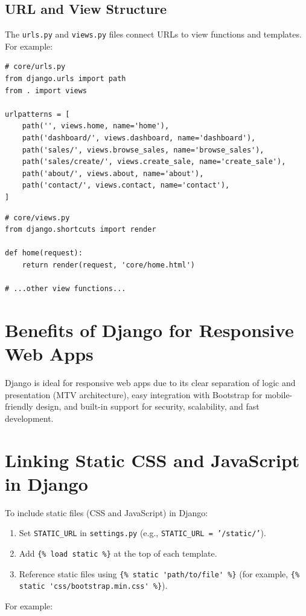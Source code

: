 \documentclass[12pt]{article}
\begin{document}
\subsection{URL and View Structure}
The \texttt{urls.py} and \texttt{views.py} files connect URLs to view functions and templates. For example:

\begin{verbatim}
# core/urls.py
from django.urls import path
from . import views

urlpatterns = [
    path('', views.home, name='home'),
    path('dashboard/', views.dashboard, name='dashboard'),
    path('sales/', views.browse_sales, name='browse_sales'),
    path('sales/create/', views.create_sale, name='create_sale'),
    path('about/', views.about, name='about'),
    path('contact/', views.contact, name='contact'),
]
\end{verbatim}

\begin{verbatim}
# core/views.py
from django.shortcuts import render

def home(request):
    return render(request, 'core/home.html')

# ...other view functions...
\end{verbatim}

\section{Benefits of Django for Responsive Web Apps}
Django is ideal for responsive web apps due to its clear separation of logic and presentation (MTV architecture), easy integration with Bootstrap for mobile-friendly design, and built-in support for security, scalability, and fast development.

\section{Linking Static CSS and JavaScript in Django}
To include static files (CSS and JavaScript) in Django:
\begin{enumerate}
    \item Set \texttt{STATIC\_URL} in \texttt{settings.py} (e.g., \texttt{STATIC\_URL = '/static/'}).
    \item Add \verb|{% load static %}| at the top of each template.
    \item Reference static files using \verb|{% static 'path/to/file' %}| (for example, \verb|{% static 'css/bootstrap.min.css' %}|).
\end{enumerate}
For example:
\end{document}
